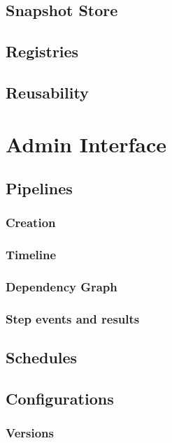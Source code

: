 \subsection{Snapshot Store}

\subsection{Registries}

\subsection{Reusability}

\section{Admin Interface}

\subsection{Pipelines}

\subsubsection{Creation}

\subsubsection{Timeline}

\subsubsection{Dependency Graph}

\subsubsection{Step events and results}

\subsection{Schedules}

\subsection{Configurations}

\subsubsection{Versions}

